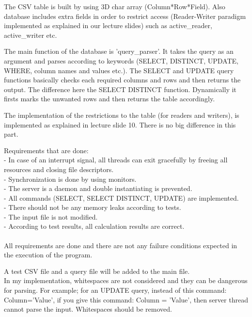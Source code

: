 \documentclass[12pt, a4paper]{article}
\begin{document}
\clearpage
{}
\justify
The CSV table is built by using 3D char array (Column*Row*Field). Also database includes extra fields in order to restrict access (Reader-Writer paradigm implemented as explained in our lecture slides) such as active\_reader, active\_writer etc. 

The main function of the database is 'query\_parser'. It takes the query as an argument and parses according to keywords (SELECT, DISTINCT, UPDATE, WHERE, column names and values etc.). 
The SELECT and UPDATE query functions basically checks each required columns and rows and then returns the output.
The difference here the SELECT DISTINCT function. Dynamically it firsts marks the unwanted rows and then returns the table accordingly.

The implementation of the restrictions to the table (for readers and writers), is implemented as explained in lecture slide 10. There is no big difference in this part.

\justify
    
    Requirements that are done:\\
    - In case of an interrupt signal, all threads can exit gracefully by freeing all resources and closing file descriptors. \\
    - Synchronization is done by using monitors.\\
    - The server is a daemon and double instantiating is prevented.\\
    - All commands (SELECT, SELECT DISTINCT, UPDATE) are implemented.\\
    - There should not be any memory leaks according to tests.\\
    - The input file is not modified.\\
    - According to test results, all calculation results are correct.\\
    \\
    All requirements are done and there are not any failure conditions expected in the execution of the program.\\
    
\justify

A test CSV file and a query file will be added to the main file.\\
In my implementation, whitespaces are not considered and they can be dangerous for parsing. For example; for an UPDATE query, instead of this command: Column='Value', if you give this command: Column = 'Value', then server thread cannot parse the input. Whitespaces should be removed.\\

\justify
\end{document}
